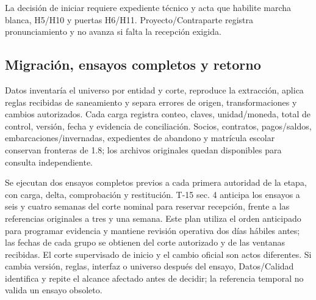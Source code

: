 La decisión de iniciar requiere expediente técnico y acta que habilite marcha blanca, H5/H10 y puertas H6/H11. Proyecto/Contraparte registra pronunciamiento y no avanza si falta la recepción exigida.


\subsection{Migración, ensayos completos y retorno}
Datos inventaría el universo por entidad y corte, reproduce la extracción, aplica reglas recibidas de saneamiento y separa errores de origen, transformaciones y cambios autorizados. Cada carga registra conteo, claves, unidad/moneda, total de control, versión, fecha y evidencia de conciliación. Socios, contratos, pagos/saldos, embarcaciones/invernadas, expedientes de abandono y matrícula escolar conservan fronteras de 1.8; los archivos originales quedan disponibles para consulta independiente.

Se ejecutan dos ensayos completos previos a cada primera autoridad de la etapa, con carga, delta, comprobación y restitución. T-15 sec. 4 anticipa los ensayos a seis y cuatro semanas del corte nominal para reservar recepción, frente a las referencias originales a tres y una semana. Este plan utiliza el orden anticipado para programar evidencia y mantiene revisión operativa dos días hábiles antes; las fechas de cada grupo se obtienen del corte autorizado y de las ventanas recibidas. El corte supervisado de inicio y el cambio oficial son actos diferentes. Si cambia versión, reglas, interfaz o universo después del ensayo, Datos/Calidad identifica y repite el alcance afectado antes de decidir; la referencia temporal no valida un ensayo obsoleto.

